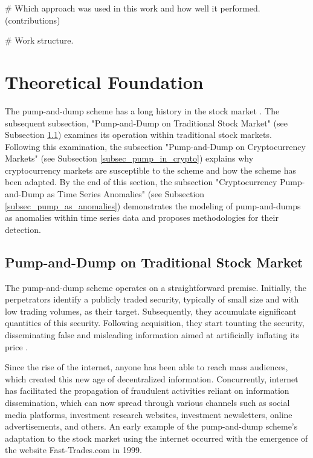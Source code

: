 \documentclass[12pt]{article}
\begin{document}
	\# Which approach was used in this work and how well it performed. (contributions)

	\# Work structure. 
	
	\section{Theoretical Foundation}
	\label{sec_fund_teorica}

	The pump-and-dump scheme has a long history in the stock market \citep{lamorgia2020}.
	The subsequent subsection, "Pump-and-Dump on Traditional Stock Market" (see Subsection \ref{subsec_pump_def}) examines its operation within traditional stock markets.
	Following this examination, the subsection "Pump-and-Dump on Cryptocurrency Markets" (see Subsection \ref{subsec_pump_in_crypto}) explains why cryptocurrency markets are susceptible to the scheme and how the scheme has been adapted.
	By the end of this section, the subsection "Cryptocurrency Pump-and-Dump as Time Series Anomalies" (see Subsection \ref{subsec_pump_as_anomalies}) demonstrates the modeling of pump-and-dumps as anomalies within time series data and proposes methodologies for their detection.

	\subsection{Pump-and-Dump on Traditional Stock Market}
	\label{subsec_pump_def}

	The pump-and-dump scheme operates on a straightforward premise.
	Initially, the perpetrators identify a publicly traded security, typically of small size and with low trading volumes, as their target.
	Subsequently, they accumulate significant quantities of this security.
	Following acquisition, they start tounting the security, disseminating false and misleading information aimed at artificially inflating its price \citep{kramer2005}.

	Since the rise of the internet, anyone has been able to reach mass audiences, which created this new age of decentralized information.
	Concurrently, internet has facilitated the propagation of fraudulent activities reliant on information dissemination, which can now spread through various channels such as social media platforms, investment research websites, investment newsletters, online advertisements, and others.
	An early example of the pump-and-dump scheme's adaptation to the stock market using the internet occurred with the emergence of the website Fast-Trades.com in 1999.
\end{document}
